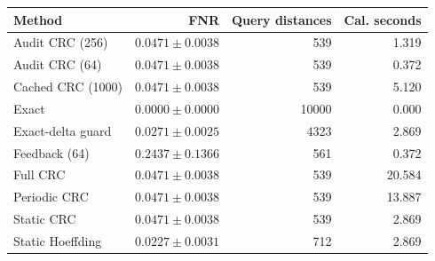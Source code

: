 \begin{tabular}{lrrr}
\hline
Method & FNR & Query distances & Cal. seconds \\
\hline
Audit CRC (256) & $0.0471 \pm 0.0038$ & 539 & 1.319 \\
Audit CRC (64) & $0.0471 \pm 0.0038$ & 539 & 0.372 \\
Cached CRC (1000) & $0.0471 \pm 0.0038$ & 539 & 5.120 \\
Exact & $0.0000 \pm 0.0000$ & 10000 & 0.000 \\
Exact-delta guard & $0.0271 \pm 0.0025$ & 4323 & 2.869 \\
Feedback (64) & $0.2437 \pm 0.1366$ & 561 & 0.372 \\
Full CRC & $0.0471 \pm 0.0038$ & 539 & 20.584 \\
Periodic CRC & $0.0471 \pm 0.0038$ & 539 & 13.887 \\
Static CRC & $0.0471 \pm 0.0038$ & 539 & 2.869 \\
Static Hoeffding & $0.0227 \pm 0.0031$ & 712 & 2.869 \\
\hline
\end{tabular}
